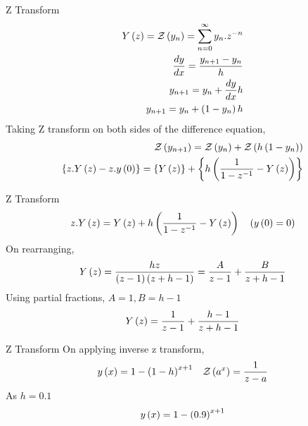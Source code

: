 \documentclass{beamer}
\begin{document}
\begin{frame}{Z Transform}
\begin{align*}
  Y\left(z\right)=\mathcal{Z}\left(y_{n}\right)=\sum_{n=0}^{\infty} y_{n}.z^{-n}\\
  \frac{dy}{dx}=\frac{{}y_{n+1}-y_{n}}{h}\\
  y_{n+1}=y_{n}+\frac{dy}{dx}h\\
  y_{n+1}=y_{n}+\left(1-y_{n}\right)h\\
\end{align*}
Taking Z transform on both sides of the difference equation,
\begin{align*}
    \mathcal{Z}\left(y_{n+1}\right)=\mathcal{Z}\left(y_{n}\right)+\mathcal{Z}\left(h\left(1-y_{n}\right)\right)\\
    \left\{z.Y\left(z\right)-z.y\left(0\right)\right\}=\left\{Y\left(z\right)\right\}+\left\{h\left(\frac{1}{1-z^{-1}}-Y\left(z\right)\right)\right\}
\end{align*}
\end{frame}    
\begin{frame}{Z Transform}
\begin{align*}
    z.Y\left(z\right)=Y\left(z\right)+h\left(\frac{1}{1-z^{-1}}-Y\left(z\right)\right) \quad \left(y\left(0\right)=0\right)
\end{align*}
On rearranging,
\begin{align*}
    Y\left(z\right)=\frac{hz}{\left(z-1\right)\left(z+h-1\right)}=\frac{A}{z-1}+\frac{B}{z+h-1}
\end{align*}
Using partial fractions, $A=1,B=h-1$
\begin{align*}
    Y\left(z\right)=\frac{1}{z-1}+\frac{h-1}{z+h-1}
\end{align*}
\end{frame}
\begin{frame}{Z Transform}
On applying inverse z transform,
\begin{align*}
    y\left(x\right)=1-{\left(1-h\right)}^{x+1} \quad \mathcal{Z}\left(a^x\right)=\frac{1}{z-a}
\end{align*}
As $h=0.1$\\
\begin{align*}
y\left(x\right)=1-{\left(0.9\right)}^{x+1}
\end{align*}   
\end{frame}
\end{document}
